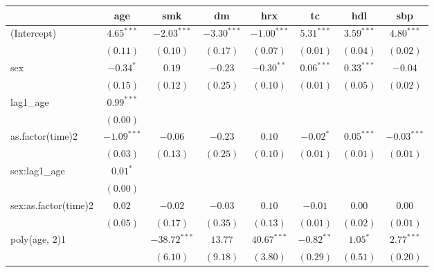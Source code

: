 
\begin{tabular}{l c c c c c c c}
\toprule
 & age & smk & dm & hrx & tc & hdl & sbp \\
\midrule
(Intercept)          & $4.65^{***}$  & $-2.03^{***}$  & $-3.30^{***}$ & $-1.00^{***}$ & $5.31^{***}$  & $3.59^{***}$  & $4.80^{***}$  \\
                     & $(0.11)$      & $(0.10)$       & $(0.17)$      & $(0.07)$      & $(0.01)$      & $(0.04)$      & $(0.02)$      \\
sex                  & $-0.34^{*}$   & $0.19$         & $-0.23$       & $-0.30^{**}$  & $0.06^{***}$  & $0.33^{***}$  & $-0.04$       \\
                     & $(0.15)$      & $(0.12)$       & $(0.25)$      & $(0.10)$      & $(0.01)$      & $(0.05)$      & $(0.02)$      \\
lag1\_age            & $0.99^{***}$  &                &               &               &               &               &               \\
                     & $(0.00)$      &                &               &               &               &               &               \\
as.factor(time)2     & $-1.09^{***}$ & $-0.06$        & $-0.23$       & $0.10$        & $-0.02^{*}$   & $0.05^{***}$  & $-0.03^{***}$ \\
                     & $(0.03)$      & $(0.13)$       & $(0.25)$      & $(0.10)$      & $(0.01)$      & $(0.01)$      & $(0.01)$      \\
sex:lag1\_age        & $0.01^{*}$    &                &               &               &               &               &               \\
                     & $(0.00)$      &                &               &               &               &               &               \\
sex:as.factor(time)2 & $0.02$        & $-0.02$        & $-0.03$       & $0.10$        & $-0.01$       & $0.00$        & $0.00$        \\
                     & $(0.05)$      & $(0.17)$       & $(0.35)$      & $(0.13)$      & $(0.01)$      & $(0.02)$      & $(0.01)$      \\
poly(age, 2)1        &               & $-38.72^{***}$ & $13.77$       & $40.67^{***}$ & $-0.82^{**}$  & $1.05^{*}$    & $2.77^{***}$  \\
                     &               & $(6.10)$       & $(9.18)$      & $(3.80)$      & $(0.29)$      & $(0.51)$      & $(0.20)$      \\

\end{tabular}
